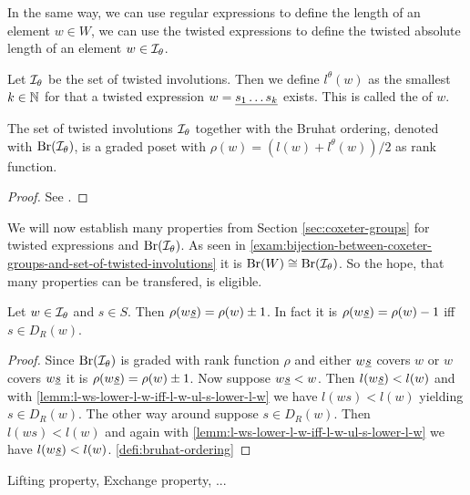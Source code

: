 In the same way, we can use regular expressions to define the length of an element $w \in W$, we can use the twisted expressions to define the twisted absolute length of an element $w \in \mathcal{I}_{\theta}$.

\begin{defi}
	Let $\mathcal{I}_{\theta}$ be the set of twisted involutions. Then we define $l^\theta(w)$ as the smallest $k \in \mathbb{N}$ for that a twisted expression $w = \underline{s_1 \ldots s_k}$ exists. This is called the  of $w$.
\end{defi}

\begin{lemm}
	The set of twisted involutions $\mathcal{I}_{\theta}$ together with the Bruhat ordering, denoted with $\operatorname{Br}(\mathcal{I}_{\theta})$, is a graded poset with $\rho(w) = (l(w) + l^\theta(w))/2$ as rank function.

	\begin{proof}
		See \cite[Theorem 4.8]{hultman:bruhat-order}.
	\end{proof}
\end{lemm}

We will now establish many properties from Section \ref{sec:coxeter-groups} for twisted expressions and $\operatorname{Br}(\mathcal{I}_{\theta})$. As seen in \ref{exam:bijection-between-coxeter-groups-and-set-of-twisted-involutions} it is $\operatorname{Br}(W) \cong \operatorname{Br}(\mathcal{I}_{\theta})$. So the hope, that many properties can be transfered, is eligible.

\begin{lemm}
	Let $w \in \mathcal{I}_{\theta}$ and $s \in S$. Then $\rho(w \underline{s}) = \rho(w) \pm 1$. In fact it is $\rho(w \underline{s}) = \rho(w) - 1$ iff $s \in D_R(w)$.

	\begin{proof}
		Since $\operatorname{Br}(\mathcal{I}_{\theta})$ is graded with rank function $\rho$ and either $w \underline{s}$ covers $w$ or $w$ covers $w \underline{s}$ it is $\rho(w \underline{s}) = \rho(w) \pm 1$. Now suppose $w \underline{s} < w$. Then $l(w \underline{s}) < l(w)$ and with \ref{lemm:l-ws-lower-l-w-iff-l-w-ul-s-lower-l-w} we have $l(w s) < l(w)$ yielding $s \in D_R(w)$. The other way around suppose $s \in D_R(w)$. Then $l(w s) < l(w)$ and again with \ref{lemm:l-ws-lower-l-w-iff-l-w-ul-s-lower-l-w} we have $l(w \underline{s}) < l(w)$.
		\ref{defi:bruhat-ordering}
	\end{proof}
\end{lemm}

\todo Lifting property, Exchange property, ...